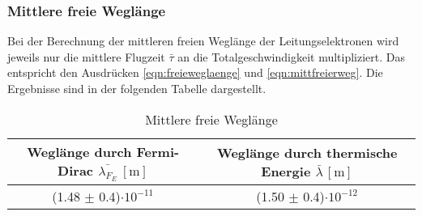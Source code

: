 \subsubsection{Mittlere freie Weglänge}
Bei der Berechnung der mittleren freien Weglänge der Leitungselektronen wird jeweils nur die mittlere Flugzeit $\bar{\tau}$ an die Totalgeschwindigkeit multipliziert.
Das entspricht den Ausdrücken \eqref{eqn:freieweglaenge} und \eqref{eqn:mittfreierweg}.
Die Ergebnisse sind in der folgenden Tabelle dargestellt.
\begin{table}
  \centering
  \caption{Mittlere freie Weglänge}
  \label{tab:tabweg}
  \begin{tabular}{c c }
    Weglänge durch Fermi-Dirac {$\bar{\lambda_{F_{E}}} \: [\si{\meter}]$} & Weglänge durch thermische Energie {$\bar{\lambda} \, [\si{\meter}]$} \\
    \midrule
    (1.48 $\pm$ 0.4)$\cdot 10^{-11}$  & (1.50 $\pm$ 0.4)$\cdot 10^{-12}$\\
    \bottomrule
  \end{tabular}
\end{table}
